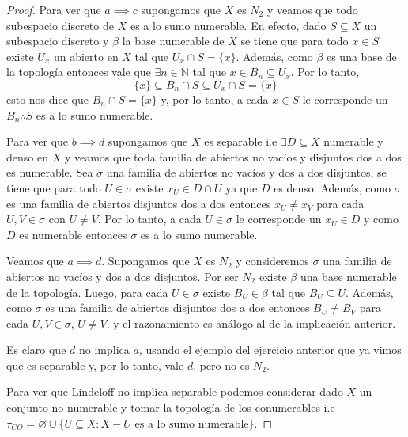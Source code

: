 \documentclass{article}
\theoremstyle{definition}
\newcommand{\N}{\mathbb{N}}
\begin{document}
\begin{proof}
    Para ver que \( a \implies c \) supongamos que \( X \) es \( N_2 \) y veamos que todo subespacio discreto de \( X \) es a lo sumo numerable. En efecto, dado \( S \subseteq X \) un subespacio discreto
    y \( \beta \) la base numerable de \( X \) se tiene que para todo \( x \in S \) existe \( U_x \) un abierto en \( X \) tal que \( U_x \cap S = \{ x \} \). Además, como \( \beta \) es una base de la topología
    entonces vale que \( \exists n \in \N \) tal que \( x \in B_n \subseteq U_x \). Por lo tanto, \[
        \{ x \} \subseteq B_n \cap S \subseteq U_x \cap S = \{ x \}
    \]
    esto nos dice que \( B_n \cap S = \{ x \} \) y, por lo tanto, a cada \( x \in S \) le corresponde un \( B_n \therefore S \) es a lo sumo numerable.

    Para ver que \( b \implies d \) supongamos que \( X \) es separable i.e \( \exists D \subseteq X \) numerable y denso en \( X \) y veamos que toda familia de abiertos no vacíos y disjuntos dos a dos es numerable.
    Sea \( \sigma \) una familia de abiertos no vacíos y dos a dos disjuntos, se tiene que para todo \( U \in \sigma \) existe \( x_U \in D \cap U \) ya que \( D \) es denso. Además, como \( \sigma \) es una familia
    de abiertos disjuntos dos a dos entonces \( x_U \neq x_V \) para cada \(U, V \in \sigma \) con \( U \neq V \). Por lo tanto, a cada \( U \in \sigma \) le corresponde un \( x_U \in D \) y como \( D \) es numerable entonces \( \sigma \) es a lo sumo numerable.

    Veamos que \( a \implies d \). Supongamos que \( X \) es \( N_2 \) y consideremos \( \sigma \) una familia de abiertos no vacíos y dos a dos disjuntos. Por ser \( N_2 \) existe \( \beta \) una base numerable de la topología.
    Luego, para cada \( U \in \sigma \) existe \( B_U \in \beta \) tal que \( B_U \subseteq U \). Además, como \( \sigma \) es una familia de abiertos disjuntos dos a dos entonces \( B_U \neq B_V \) para cada \(U, V \in \sigma \), \( U \neq V \).
    y el razonamiento es análogo al de la implicación anterior.

    Es claro que \( d \) no implica \( a \), usando el ejemplo del ejercicio anterior que ya vimos que es separable y, por lo tanto, vale \( d \), pero no es \( N_2 \).

    Para ver que Lindeloff no implica separable podemos considerar dado \( X \) un conjunto no numerable y tomar la topología de los conumerables i.e \( \tau_{CO} = \varnothing \cup \{ U \subseteq X : X - U \text{ es a lo sumo numerable} \} \).
\end{proof}
\end{document}
